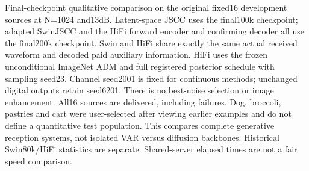 Final-checkpoint qualitative comparison on the original fixed16 development sources at N=1024 and13dB. Latent-space JSCC uses the final100k checkpoint; adapted SwinJSCC and the HiFi forward encoder and confirming decoder all use the final200k checkpoint. Swin and HiFi share exactly the same actual received waveform and decoded paid auxiliary information. HiFi uses the frozen unconditional ImageNet ADM and full registered posterior schedule with sampling seed23. Channel seed2001 is fixed for continuous methods; unchanged digital outputs retain seed6201. There is no best-noise selection or image enhancement. All16 sources are delivered, including failures. Dog, broccoli, pastries and cart were user-selected after viewing earlier examples and do not define a quantitative test population. This compares complete generative reception systems, not isolated VAR versus diffusion backbones. Historical Swin80k/HiFi statistics are separate. Shared-server elapsed times are not a fair speed comparison.
